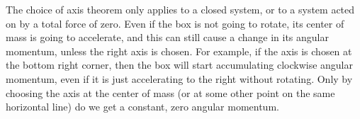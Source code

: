 The choice of axis theorem only applies to a closed system, or to a
system acted on by a total force of zero. Even if the box is not going
to rotate, its center of mass is going to accelerate,
and this can still cause a change in its angular momentum, unless
the right axis is chosen. For example, if the axis is chosen
at the bottom right corner, then the box will start accumulating
clockwise angular momentum, even if it is just accelerating to the
right without rotating. Only by choosing the axis at the center of
mass (or at some other point on the same horizontal line) do we get
a constant, zero angular momentum.



